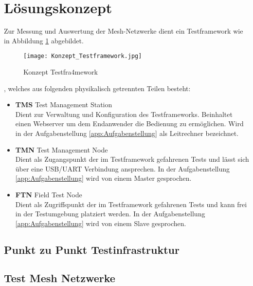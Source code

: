 \clearpage
\section{Lösungskonzept}\label{sec:Loesungskonzept}

Zur Messung und Auswertung der Mesh-Netzwerke dient ein Testframework wie in Abbildung \ref{fig:KonzeptTestframework} abgebildet.

\begin{figure}[H]
	\centering
	\texttt{[image: Konzept\_Testframework.jpg]}
	\caption{Konzept Testfra4mework}\label{fig:KonzeptTestframework}
\end{figure}


, welches aus folgenden physikalisch getrennten Teilen besteht:

\begin{itemize}
	\item \textbf{TMS} Test Management Station \\ 
	Dient zur Verwaltung und Konfiguration des Testframeworks. Beinhaltet einen Webserver um dem Endanwender die Bedienung zu ermöglichen. Wird in der Aufgabenstellung \ref{app:Aufgabenstellung} als Leitrechner bezeichnet. 
	\item \textbf{TMN} Test Management Node \\ 
	Dient als Zugangspunkt der im Testframework gefahrenen Tests und lässt sich über eine USB/UART Verbindung ansprechen. In der Aufgabenstellung \ref{app:Aufgabenstellung} wird von einem Master gesprochen. 
	\item \textbf{FTN} Field Test Node \\ 
	Dient als Zugriffspunkt der im Testframework gefahrenen Tests und kann frei in der Testumgebung platziert werden. In der Aufgabenstellung  \ref{app:Aufgabenstellung} wird von einem Slave gesprochen. 
\end{itemize}



\subsection{Punkt zu Punkt Testinfrastruktur}\label{subsec:PunktzuPunktTestinfrastruktur}


\subsection{Test Mesh Netzwerke}\label{subsec:TestMeshNetzwerke}

